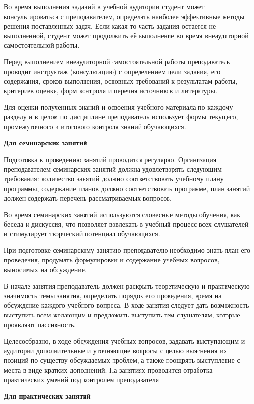 \documentclass[a4paper, 12pt]{article}
\begin{document}
Во время выполнения заданий в учебной аудитории студент может консультироваться с преподавателем, определять наиболее эффективные методы решения поставленных задач. Если какая-то часть задания остается не выполненной, студент может продолжить её выполнение во время внеаудиторной самостоятельной работы.

Перед выполнением внеаудиторной самостоятельной работы преподаватель проводит инструктаж (консультацию) с определением цели задания, его содержания, сроков выполнения, основных требований к результатам работы, критериев оценки, форм контроля и перечня источников и литературы.

Для оценки полученных знаний и освоения учебного материала по каждому разделу и в целом по дисциплине преподаватель использует формы текущего, промежуточного и итогового контроля знаний обучающихся.

\vspace{8pt}
{\bf Для семинарских занятий}

Подготовка к проведению занятий проводится регулярно. Организация преподавателем семинарских занятий должна удовлетворять следующим требования: количество занятий должно соответствовать учебному плану программы, содержание планов должно соответствовать программе, план занятий должен содержать перечень рассматриваемых вопросов.

Во время семинарских занятий используются словесные методы обучения, как беседа и дискуссия, что позволяет вовлекать в учебный процесс всех слушателей и стимулирует творческий потенциал обучающихся. 

При подготовке семинарскому занятию преподавателю необходимо знать план его проведения, продумать формулировки и содержание учебных вопросов, выносимых на обсуждение. 

В начале занятия преподаватель должен раскрыть теоретическую и практическую значимость темы занятия, определить порядок его проведения, время на обсуждение каждого учебного вопроса. В ходе занятия следует дать возможность выступить всем желающим и предложить выступить тем слушателям, которые проявляют пассивность.

Целесообразно, в ходе обсуждения учебных вопросов, задавать выступающим и аудитории дополнительные и уточняющие вопросы с целью выяснения их позиций по существу обсуждаемых проблем, а также поощрять выступление с места в виде кратких дополнений. На занятиях проводится отработка практических умений под контролем преподавателя

\vspace{8pt}
{\bf Для практических занятий}
\end{document}
